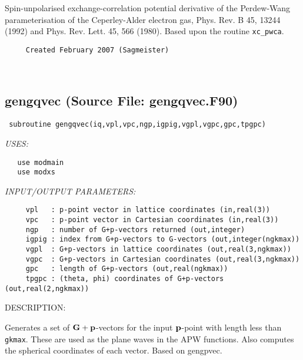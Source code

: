 \documentclass[11pt]{article}
\begin{document}
     Spin-unpolarised exchange-correlation potential derivative of the 
     Perdew-Wang
     parameterisation of the Ceperley-Alder electron gas,
     Phys. Rev. B 45, 13244
     (1992) and Phys. Rev. Lett. 45, 566 (1980). Based upon the routine
     {\tt xc\_pwca}.
  
\begin{verbatim}     Created February 2007 (Sagmeister)\end{verbatim}








 
 
\mbox{}\hrulefill\ 
 
\subsection{gengqvec (Source File: gengqvec.F90)}


\begin{verbatim} subroutine gengqvec(iq,vpl,vpc,ngp,igpig,vgpl,vgpc,gpc,tpgpc)\end{verbatim}{\em USES:}
\begin{verbatim}   use modmain
   use modxs\end{verbatim}{\em INPUT/OUTPUT PARAMETERS:}
\begin{verbatim}     vpl   : p-point vector in lattice coordinates (in,real(3))
     vpc   : p-point vector in Cartesian coordinates (in,real(3))
     ngp   : number of G+p-vectors returned (out,integer)
     igpig : index from G+p-vectors to G-vectors (out,integer(ngkmax))
     vgpl  : G+p-vectors in lattice coordinates (out,real(3,ngkmax))
     vgpc  : G+p-vectors in Cartesian coordinates (out,real(3,ngkmax))
     gpc   : length of G+p-vectors (out,real(ngkmax))
     tpgpc : (theta, phi) coordinates of G+p-vectors (out,real(2,ngkmax))\end{verbatim}
{\sf DESCRIPTION:\\ }


     Generates a set of ${\bf G+p}$-vectors for the input ${\bf p}$-point with
     length less than {\tt gkmax}. These are used as the plane waves in the APW
     functions. Also computes the spherical coordinates of each vector.
     Based on gengpvec.
  
\end{document}

